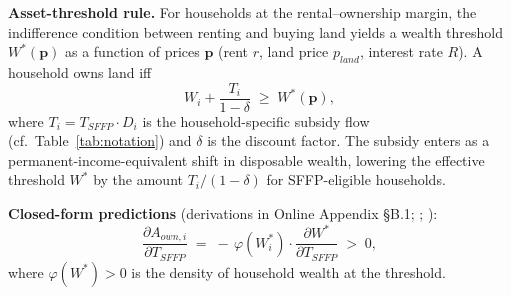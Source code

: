 \documentclass[12pt, a4paper]{article}
\begin{document}
\textbf{Asset-threshold rule.} For households at the rental--ownership margin, the indifference condition between renting and buying land yields a wealth threshold $W^*(\mathbf{p})$ as a function of prices $\mathbf{p}$ (rent $r$, land price $p_{land}$, interest rate $R$). A household owns land iff
\begin{equation}
W_i + \frac{T_i}{1-\delta} \;\ge\; W^*(\mathbf{p}),
\label{eq:CO-threshold}
\end{equation}
where $T_i = T_{SFFP} \cdot D_i$ is the household-specific subsidy flow (cf.\ Table~\ref{tab:notation}) and $\delta$ is the discount factor. The subsidy enters as a permanent-income-equivalent shift in disposable wealth, lowering the effective threshold $W^*$ by the amount $T_i/(1-\delta)$ for SFFP-eligible households.

\textbf{Closed-form predictions} (derivations in Online Appendix \S B.1; \citealp{CarterOlinto2003_liquidity}; \citealp{Kazukauskas2013_disinvestment}):
\begin{equation}
\boxed{\frac{\partial A_{own,i}}{\partial T_{SFFP}} \;=\; -\,\varphi(W_i^*) \cdot \frac{\partial W^*}{\partial T_{SFFP}} \;>\; 0,}
\label{eq:CO-1}
\end{equation}
where $\varphi(W^*) > 0$ is the density of household wealth at the threshold.
\end{document}
